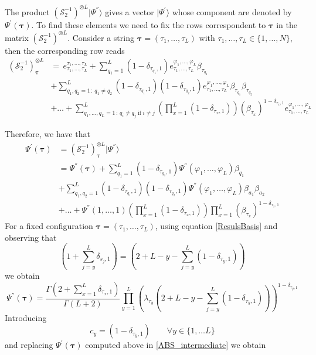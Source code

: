 \documentclass[10pt]{article}
\numberwithin{equation}{section}
\numberwithin{equation}{subsection}
\begin{document}
The product $\left(\mathcal{S}_{2}^{-1}\right)^{\otimes L}|\Psi^{''}\rangle$ gives a vector $|\Psi^{'}\rangle$ whose component are denoted by $\Psi^{'}(\bm{\tau})$. 
To find these elements we need to fix the rows correspondent to $\bm{\tau}$ in the matrix $\left(\mathcal{S}_{2}^{-1}\right)^{\otimes L}$. Consider a string $\bm{\tau}=(\tau_{1},\ldots,\tau_{L})$ with $\tau_{1},\ldots,\tau_{L}\in \{1,\ldots,N\}$, then the corresponding row reads
\begin{equation}
	\begin{split}
\left(\mathcal{S}_{2}^{-1}\right)^{\otimes L}_{\bm{\tau}}&=\,e_{\tau_{1},\ldots,\tau_{L}}^{\tau_{1},\ldots,\tau_{L}}+\sum_{q_{1}=1}^{L}(1-\delta_{\tau_{q_{1}},1})e_{\tau_{1},\ldots,\tau_{L}}^{\varphi_{1},\ldots,\varphi_{L}}\beta_{\tau_{q_{1}}}\\&+\sum_{q_{1},q_{2}=1\,:\,q_{1}\neq q_{2}}^{L}(1-\delta_{\tau_{q_{1}},1})(1-\delta_{\tau_{q_{2}},1})e_{\tau_{1},\ldots,\tau_{L}}^{\varphi_{1},\ldots,\varphi_{L}}\beta_{\tau_{q_{1}}}\beta_{\tau_{q_{2}}}
  \\&+
  \ldots+\sum_{q_{1},\ldots,q_{L}=1\,:\,q_{i}\neq q_{j}\;\text{if}\;i\neq j}^{L}\left(\prod_{x=1}^{L}(1-\delta_{\tau_{x},1})\right)\left(\beta_{\tau_{x}}\right)^{1-\delta_{\tau_{x},1}}e_{\tau_{1},\ldots,\tau_{L}}^{\varphi_{1},\ldots,\varphi_{L}}
	\end{split}
\end{equation}

Therefore, we have that 
\begin{equation}\label{ABS_intermediate}
	\begin{split}
		\Psi^{'}(\bm{\tau})&=(\mathcal{S}_{2}^{-1})_{\bm{\tau}}^{\otimes L}|\Psi^{''}\rangle\\&= \Psi^{''}(\bm{\tau})+\sum_{q_{1}= 1}^{L}(1-\delta_{\tau_{q_{1}},1})\Psi^{''}(\varphi_{1},\ldots,\varphi_{L})\beta_{q_{1}}\\&+
		\sum_{q_{1},q_{2}= 1}^{L}(1-\delta_{\tau_{q_{1}},1})(1-\delta_{\tau_{q_{2}},1})\Psi^{''}(\varphi_{1},\ldots,\varphi_{L})\beta_{a_{1}}\beta_{a_{2}}\\&+\ldots+\Psi^{''}(1,\ldots,1)\left(\prod_{x=1}^{L}(1-\delta_{\tau_{x},1})\right)\prod_{x=1}^{L}\left(\beta_{\tau_{x}}\right)^{1-\delta_{\tau_{x},1}}
	\end{split}
\end{equation}
For a fixed configuration $\bm{\tau}=(\tau_{1},\ldots,\tau_{L})$, using equation \eqref{ResulsBasis} and observing that 
\begin{equation}
  \left(1+\sum_{j=y}^{L}\delta_{s_{j},1}\right) =\left(2+L-y-\sum_{j=y}^{L}(1-\delta_{\tau_{y},1})\right)
\end{equation}
we obtain 
    \begin{equation}
\Psi^{''}(\bm{\tau})=\frac{\Gamma(2+\sum_{x=1}^{L}\delta_{\tau_{x},1})}{\Gamma(L+2)}\prod_{y=1}^{L}\left(\lambda_{\tau_{y}}\left(2+L-y-\sum_{j=y}^{L}(1-\delta_{\tau_{y},1})\right)\right)^{1-\delta_{\tau_{y},1}}
\end{equation}
Introducing
\begin{equation}
	c_{y}=(1-\delta_{\tau_{y},1}) \qquad \forall y\in \{1,\ldots L\}
\end{equation}
and replacing $\Psi^{'}(\bm{\tau})$ computed above in \eqref{ABS_intermediate} we obtain 
\end{document}
